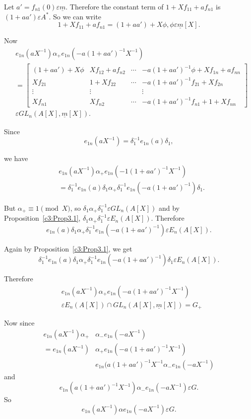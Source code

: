 \begin{Proof}
Let $a'=f_{n1}(0)\varepsilon \underline{m}$. Therefore the constant
term of $1+Xf_{11}+af_{n1}$ is $(1+aa')\varepsilon A^{\ast}$. So we
can write
$$
1+Xf_{11}+af_{n1}=(1+aa')+X\phi, \phi \varepsilon \underline{m}[X].
$$

Now
$$
\begin{aligned}
&e_{1n}\left(aX^{-1}\right)\alpha_+e_{1n}\left(-a(1+aa')^{-1}X^{-1}\right)\\
&{}=
\begin{bmatrix}
(1+aa')+X\phi & Xf_{12}+af_{n2} &\cdots &
  -a(1+aa')^{-1}\phi+Xf_{1n}+af_{nn}\\
Xf_{21} & 1+Xf_{22} & \cdots & -a(1+aa')^{-1}f_{21}+Xf_{2n}\\
\vdots & \vdots & & \vdots\\
Xf_{n1} & Xf_{n2} &\cdots & -a(1+aa')^{-1}f_{n1}+1+Xf_{nn}
\end{bmatrix}\\
&\varepsilon GL_n(A[X],\underline{m}[X]).
\end{aligned}
$$

Since 
$$
e_{1n}\left(aX^{-1}\right)=\delta^{-1}_1e_{1n}(a)\delta_1,
$$

we have 
$$
\begin{aligned}
&e_{1n}\left(aX^{-1}\right)\alpha_+e_{1n}\left(-1\left(1+aa'\right)^{-1}X^{-1}\right)\\
&{}= \delta^{-1}_1e_{1n}(a)\delta_1\alpha_+\delta^{-1}_1e_{1n}\left(-a\left(1+aa'\right)^{-1}\right)\delta_1.
\end{aligned}
$$

But $\alpha_+\equiv 1\pmod{X}$, so
$\delta_1\alpha_+\delta^{-1}_1\varepsilon GL_n(A[X])$ and by\\
Proposition~\ref{c3:Prop3.1},
$\delta_1\alpha_+\delta^{-1}_1\varepsilon E_n(A[X])$. Therefore 
$$
e_{1n}(a)\delta_1\alpha_+\delta^{-1}_1e_{1n}\left(-a(1+aa')^{-1}\right)\varepsilon E_n(A[X]).
$$

Again by Proposition~\ref{c3:Prop3.1}, we get
$$
\delta^{-1}_1e_{1n}(a)\delta_1\alpha_+\delta^{-1}_1e_{1n}\left(-a(1+aa')^{-1}\right)\delta_1\varepsilon E_n(A[X]).
$$

Therefore
$$
\begin{aligned}
&e_{1n}\left(aX^{-1}\right)\alpha_+e_{1n}\left(-a(1+aa')^{-1}X^{-1}\right)\\
&{}\varepsilon E_n(A[X])\cap GL_n(A[X],\underline{m}[X])=G_+
\end{aligned}
$$

Now since 
$$
\begin{aligned}
e_{1n}\left(aX^{-1}\right)\alpha_+&\alpha_{-}e_{1n}\left(-aX^{-1}\right)\\
=e_{1n}\left(aX^{-1}\right)&{}\alpha_+e_{1n}\left(-a(1+aa')^{-1}X^{-1}\right)\\
&{}e_{1n}(a(1+aa')^{-1}X^{-1}\alpha_{-}e_{1n}\left(-aX^{-1}\right)
\end{aligned}
$$
and
$$
e_{1n}\left(a\left(1+aa'\right)^{-1}X^{-1}\right)\alpha_{-}e_{1n}\left(-aX^{-1}\right)\varepsilon G.
$$
So
$$
e_{1n}\left(aX^{-1}\right)\alpha e_{1n}\left(-aX^{-1}\right)
\varepsilon G.
$$


\end{Proof}
